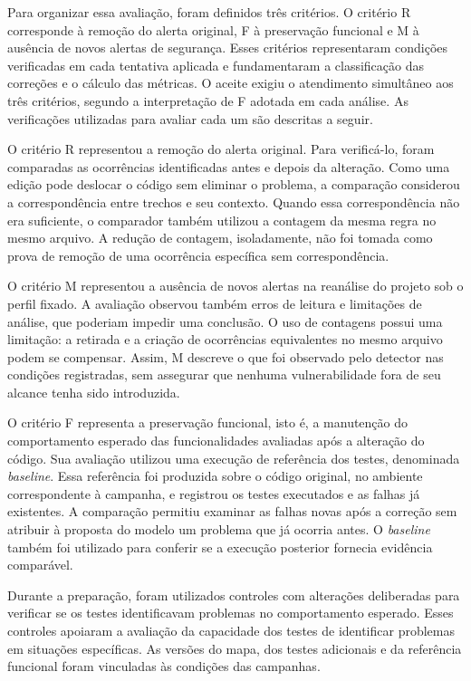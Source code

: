Para organizar essa avaliação, foram definidos três critérios. O critério R corresponde à remoção do alerta original, F à preservação funcional e M à ausência de novos alertas de segurança. Esses critérios representaram condições verificadas em cada tentativa aplicada e fundamentaram a classificação das correções e o cálculo das métricas. O aceite exigiu o atendimento simultâneo aos três critérios, segundo a interpretação de F adotada em cada análise. As verificações utilizadas para avaliar cada um são descritas a seguir.

O critério R representou a remoção do alerta original. Para verificá-lo, foram comparadas as ocorrências identificadas antes e depois da alteração. Como uma edição pode deslocar o código sem eliminar o problema, a comparação considerou a correspondência entre trechos e seu contexto. Quando essa correspondência não era suficiente, o comparador também utilizou a contagem da mesma regra no mesmo arquivo. A redução de contagem, isoladamente, não foi tomada como prova de remoção de uma ocorrência específica sem correspondência.

O critério M representou a ausência de novos alertas na reanálise do projeto sob o perfil fixado. A avaliação observou também erros de leitura e limitações de análise, que poderiam impedir uma conclusão. O uso de contagens possui uma limitação: a retirada e a criação de ocorrências equivalentes no mesmo arquivo podem se compensar. Assim, M descreve o que foi observado pelo detector nas condições registradas, sem assegurar que nenhuma vulnerabilidade fora de seu alcance tenha sido introduzida.

O critério F representa a preservação funcional, isto é, a manutenção do comportamento esperado das funcionalidades avaliadas após a alteração do código. Sua avaliação utilizou uma execução de referência dos testes, denominada \textit{baseline}. Essa referência foi produzida sobre o código original, no ambiente correspondente à campanha, e registrou os testes executados e as falhas já existentes. A comparação permitiu examinar as falhas novas após a correção sem atribuir à proposta do modelo um problema que já ocorria antes. O \textit{baseline} também foi utilizado para conferir se a execução posterior fornecia evidência comparável.

Durante a preparação, foram utilizados controles com alterações deliberadas para verificar se os testes identificavam problemas no comportamento esperado. Esses controles apoiaram a avaliação da capacidade dos testes de identificar problemas em situações específicas. As versões do mapa, dos testes adicionais e da referência funcional foram vinculadas às condições das campanhas.

